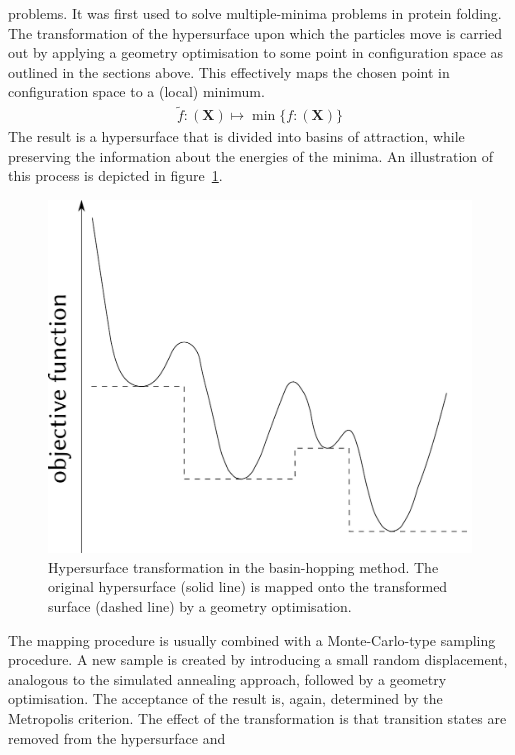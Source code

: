 problems.\autocite{Wales_GlobalOptimizationBasinHopping_1997,Doye_Structuralconsequencesrange_1997,Doye_Modelingstructureclusters_2001}
It was first used to solve multiple-minima problems in protein
folding.\autocite{Li_MonteCarlominimizationapproach_1987} The transformation of
the hypersurface upon which the particles move is carried out by applying a
geometry optimisation to some point in configuration space as outlined in the
sections above. This effectively maps the chosen point in configuration space to
a (local) minimum.
%
\begin{align}
    \widetilde{f} : (\mathbf{X}) \mapsto \min\{f : (\mathbf{X})\}
\end{align}
%
The result is a hypersurface that is divided into basins of attraction, while
preserving the information about the energies of the minima. An illustration of
this process is depicted in figure~\ref{fig:PEStransform}.
%
\begin{figure}[htb]\centering
    \includegraphics[width=.8\textwidth]{other-pics/basin-hopping.pdf}
    \caption{Hypersurface transformation in the basin-hopping method. The original hypersurface (solid line) is mapped onto the transformed surface (dashed line) by a geometry optimisation.}
    \label{fig:PEStransform}
\end{figure}
%
The mapping procedure is usually combined with a Monte-Carlo-type sampling
procedure.\autocite{Wales_GlobalOptimizationBasinHopping_1997} A new sample is
created by introducing a small random displacement, analogous to the simulated
annealing approach, followed by a geometry optimisation. The acceptance of the
result is, again, determined by the Metropolis criterion. The effect of the
transformation is that transition states are removed from the hypersurface and
